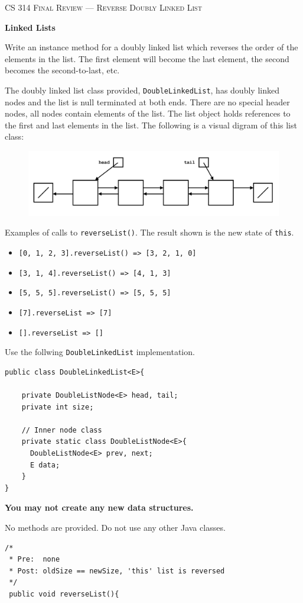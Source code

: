 \documentclass[12pt]{article}
\begin{document}
\noindent\textsc{\large CS 314 Final Review --- Reverse Doubly Linked List}

\vspace{6pt}
\noindent\textbf{Linked Lists}

\vspace{2pt}
\noindent  Write an instance method for a doubly linked list which reverses the order of the elements in the list. The first element will 
become the last element, the second becomes the second-to-last, etc. 

\vspace{4pt}
\noindent The doubly linked list class provided, \texttt{DoubleLinkedList}, has doubly linked nodes and the list is null terminated at both ends.
There are no special header nodes, all nodes contain elements of the list. The list object holds references to the first
and last elements in the list. The following is a visual digram of this list class:

\begin{figure}[h!]
  \hfill
  \includegraphics[width=115mm, scale=0.5]{diagram.png}
  \hspace*{\fill}
\end{figure}

\noindent Examples of calls to \texttt{reverseList()}. The result shown is the new state of \texttt{this}.
\begin{itemize}
  \item \texttt{[0, 1, 2, 3].reverseList() => [3, 2, 1, 0]}
  \item \texttt{[3, 1, 4].reverseList() => [4, 1, 3]}
  \item \texttt{[5, 5, 5].reverseList() => [5, 5, 5]}
  \item \texttt{[7].reverseList => [7]}
  \item \texttt{[].reverseList => []}
\end{itemize}

\vspace{6pt}
\noindent Use the follwing \texttt{DoubleLinkedList} implementation.
\begin{verbatim}
public class DoubleLinkedList<E>{

    private DoubleListNode<E> head, tail;
    private int size;
   
    // Inner node class 
    private static class DoubleListNode<E>{
      DoubleListNode<E> prev, next;
      E data;
    }
}
\end{verbatim}

\noindent \textbf{You may not create any new data structures.}

\noindent No methods are provided. Do not use any other Java classes.

\clearpage
\begin{verbatim}
/* 
 * Pre:  none
 * Post: oldSize == newSize, 'this' list is reversed
 */
 public void reverseList(){
\end{verbatim}
\end{document}
